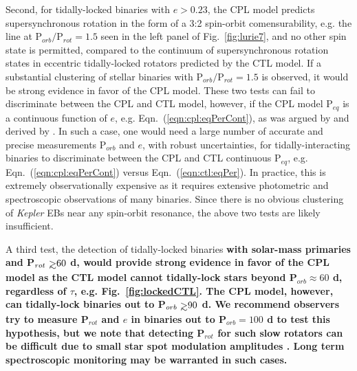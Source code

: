 \documentclass[twocolumn]{aastex61}
\def\gsim{~\rlap{$>$}{\lower 1.0ex\hbox{$\sim$}}}
\newcommand{\xxx}[1]{{\textbf{#1}}}
\newcommand{\kepler}[0]{\textit{Kepler}\xspace}
\begin{document}
Second, for tidally-locked binaries with $e > 0.23$, the CPL model predicts supersynchronous rotation in the form of a 3:2 spin-orbit comensurability, e.g. the line at P$_{orb}/$P$_{rot} = 1.5$ seen in the left panel of Fig.~\ref{fig:lurie7}, and no other spin state is permitted, compared to the continuum of supersynchronous rotation states in eccentric tidally-locked rotators predicted by the CTL model. If a substantial clustering of stellar binaries with P$_{orb}/$P$_{rot} = 1.5$ is observed, it would be strong evidence in favor of the CPL model. These two tests can fail to discriminate between the CPL and CTL model, however, if the CPL model P$_{eq}$ is a continuous function of $e$, e.g. Eqn.~(\ref{eqn:cpl:eqPerCont}), as was argued by \citet{Goldreich1966b} and derived by \citet{Murray1999}.  In such a case, one would need a large number of accurate and precise measurements P$_{orb}$ and $e$, with robust uncertainties, for tidally-interacting binaries to discriminate between the CPL and CTL continuous P$_{eq}$, e.g. Eqn.~(\ref{eqn:cpl:eqPerCont}) versus Eqn.~(\ref{eqn:ctl:eqPer}).  In practice, this is extremely observationally expensive as it requires extensive photometric and spectroscopic observations of many binaries. Since there is no obvious clustering of \kepler EBs near any spin-orbit resonance, the above two tests are likely insufficient. 

 A third test, the detection of tidally-locked binaries \xxx{with solar-mass primaries and P$_{rot} \gsim 60$ d, would provide strong evidence in favor of the CPL model as the CTL model cannot tidally-lock stars beyond P$_{orb} \approx 60$ d, regardless of $\tau$, e.g. Fig.~\ref{fig:lockedCTL}. The CPL model, however, can tidally-lock binaries out to P$_{orb} \gsim 90$ d.  We recommend observers try to measure P$_{rot}$ and $e$ in binaries out to P$_{orb} = 100 $ d to test this hypothesis, but we note that detecting P$_{rot}$ for such slow rotators can be difficult due to small star spot modulation amplitudes \citep{McQuillan2014,Lurie2017,Reinhold2018}. Long term spectroscopic monitoring may be warranted in such cases.}
\end{document}
